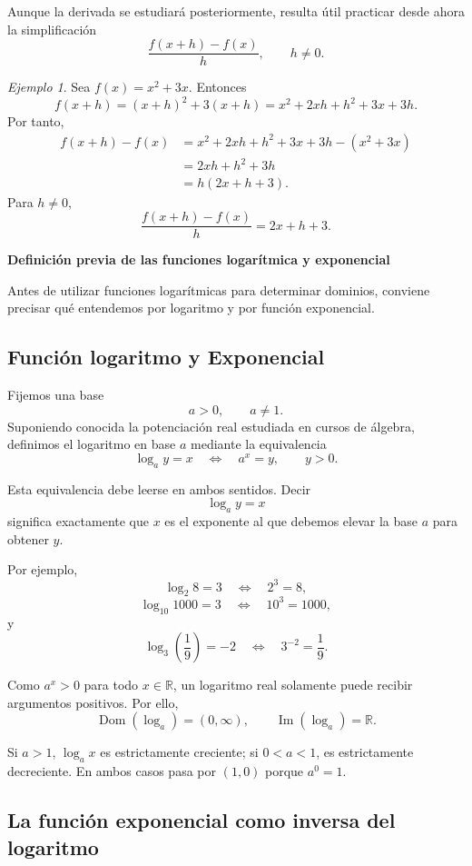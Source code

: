 \documentclass[12pt]{article}
\theoremstyle{remark}
\newtheorem{ejemplo}{Ejemplo}[section]
\newcommand{\R}{\mathbb{R}}
\newcommand{\Dom}{\operatorname{Dom}}
\newcommand{\Ima}{\operatorname{Im}}
\begin{document}
Aunque la derivada se estudiará posteriormente, resulta útil practicar desde
ahora la simplificación
\[
\frac{f(x+h)-f(x)}{h},\qquad h\neq0.
\]

\begin{ejemplo}
Sea $f(x)=x^2+3x$. Entonces
\[
f(x+h)=(x+h)^2+3(x+h)
=x^2+2xh+h^2+3x+3h.
\]
Por tanto,
\begin{align*}
f(x+h)-f(x)
&=x^2+2xh+h^2+3x+3h-(x^2+3x)\\
&=2xh+h^2+3h\\
&=h(2x+h+3).
\end{align*}
Para $h\neq0$,
\[
\frac{f(x+h)-f(x)}{h}=2x+h+3.
\]
\end{ejemplo}


\textbf{Definición previa de las funciones logarítmica y exponencial}

Antes de utilizar funciones logarítmicas para determinar dominios, conviene
precisar qué entendemos por logaritmo y por función exponencial.

\subsection*{Función logaritmo y Exponencial}

Fijemos una base
\[
a>0,\qquad a\neq1.
\]
Suponiendo conocida la potenciación real estudiada en cursos de álgebra,
definimos el logaritmo en base $a$ mediante la equivalencia
\[
\boxed{\log_a y=x\quad\Longleftrightarrow\quad a^x=y},
\qquad y>0.
\]

Esta equivalencia debe leerse en ambos sentidos. Decir
\[
\log_a y=x
\]
significa exactamente que $x$ es el exponente al que debemos elevar la base
$a$ para obtener $y$.

Por ejemplo,
\[
\log_2 8=3
\quad\Longleftrightarrow\quad
2^3=8,
\]
\[
\log_{10}1000=3
\quad\Longleftrightarrow\quad
10^3=1000,
\]
y
\[
\log_3\!\left(\frac19\right)=-2
\quad\Longleftrightarrow\quad
3^{-2}=\frac19.
\]

Como $a^x>0$ para todo $x\in\R$, un logaritmo real solamente puede recibir
argumentos positivos. Por ello,
\[
\boxed{\Dom(\log_a)=(0,\infty)},
\qquad
\boxed{\Ima(\log_a)=\R}.
\]

Si $a>1$, $\log_a x$ es estrictamente creciente; si $0<a<1$, es estrictamente
decreciente. En ambos casos pasa por $(1,0)$ porque $a^0=1$.

\subsection*{La función exponencial como inversa del logaritmo}
\end{document}
